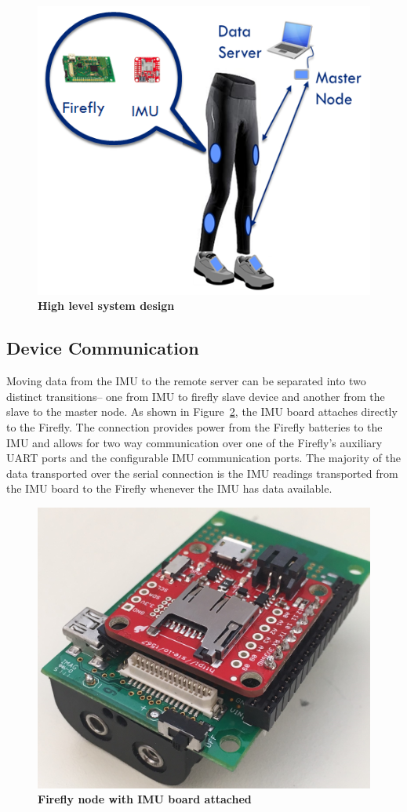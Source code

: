 \documentclass[conference]{IEEEtran}
\begin{document}
\begin{figure}[h]
  \centering
  \includegraphics[width=0.75\columnwidth]{figs/sysarch}
  \caption{{\bf High level system design}}
  \label{fig:overview}
\end{figure}



\subsection{Device Communication}
Moving data from the IMU to the remote server can be separated into two distinct
transitions-- one from IMU to firefly slave device and another from the slave to the
master node. As shown in Figure~\ref{fig:ff}, the IMU board attaches directly to the
Firefly. The connection provides power from the Firefly batteries to the IMU and allows
for two way communication over one of the Firefly's auxiliary UART ports and the
configurable IMU communication ports. The majority of the data transported over the serial
connection is the IMU readings transported from the IMU board to the Firefly whenever the
IMU has data available. 

\begin{figure}[ht]
  \centering
  \includegraphics[width=0.6\columnwidth]{figs/cropped2}
  \caption{{\bf Firefly node with IMU board attached}}
  \label{fig:ff}
\end{figure}
\end{document}
